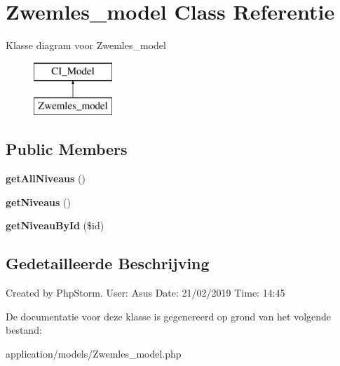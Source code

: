 \hypertarget{class_zwemles__model}{}\section{Zwemles\+\_\+model Class Referentie}
\label{class_zwemles__model}
Klasse diagram voor Zwemles\+\_\+model\begin{figure}[H]
\begin{center}
\leavevmode
\includegraphics[height=2.000000cm]{class_zwemles__model}
\end{center}
\end{figure}
\subsection*{Public Members}
\begin{DoxyCompactItemize}
\item 
\mbox{\label{class_zwemles__model_a6ed8e00b5ed89a66362d3f72f4543762}} 
{\bfseries get\+All\+Niveaus} ()
\item 
\mbox{\label{class_zwemles__model_ad63efbb5ea7178308df5339bc4b486bb}} 
{\bfseries get\+Niveaus} ()
\item 
\mbox{\label{class_zwemles__model_a45cc018b2db829e5d9a06c85523a9394}} 
{\bfseries get\+Niveau\+By\+Id} (\$id)
\end{DoxyCompactItemize}


\subsection{Gedetailleerde Beschrijving}
Created by Php\+Storm. User\+: Asus Date\+: 21/02/2019 Time\+: 14\+:45 

De documentatie voor deze klasse is gegenereerd op grond van het volgende bestand\+:\begin{DoxyCompactItemize}
\item 
application/models/Zwemles\+\_\+model.\+php\end{DoxyCompactItemize}

